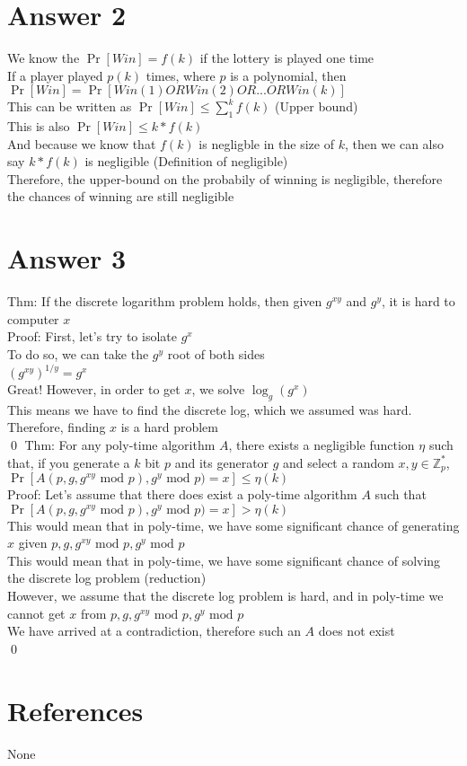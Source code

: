 \documentclass[11pt]{article}
\theoremstyle{definition}
\begin{document}
\section*{Answer 2}
We know the $\Pr[Win] = f(k)$ if the lottery is played one time\\
If a player played $p(k)$ times, where $p$ is a polynomial, then $\Pr[Win] = \Pr[Win(1) OR Win(2) OR ... OR Win(k)]$\\
This can be written as $\Pr[Win] \le \sum_{1}^{k}f(k)$ (Upper bound)\\
This is also $\Pr[Win] \le k*f(k)$\\
And because we know that $f(k)$ is negligble in the size of $k$, then we can also say $k*f(k)$ is negligible (Definition of negligible)\\
Therefore, the upper-bound on the probabily of winning is negligible, therefore the chances of winning are still negligible\\

\section*{Answer 3}
Thm: If the discrete logarithm problem holds, then given $g^{xy}$ and $g^{y}$, it is hard to computer $x$\\
\newline
Proof: First, let's try to isolate $g^x$\\
To do so, we can take the $g^y$ root of both sides\\
$(g^{xy})^{1/y} = g^x$\\
Great! However, in order to get $x$, we solve $\log_g(g^x)$\\
This means we have to find the discrete log, which we assumed was hard.  Therefore, finding $x$ is a hard problem\\
\qed
\newline
Thm: For any poly-time algorithm $A$, there exists a negligible function $\eta$ such that, if you generate a $k$ bit $p$ and its generator $g$ and select a random $x,y \in \mathbb{Z}_p^*$, $\Pr[A(p,g,g^{xy} \text { mod } p), g^y \text{ mod } p) = x] \le \eta(k)$\\
\newline
Proof: Let's assume that there does exist a poly-time algorithm $A$ such that $\Pr[A(p,g,g^{xy} \text { mod } p), g^y \text{ mod } p) = x] > \eta(k)$\\
This would mean that in poly-time, we have some significant chance of generating $x$ given $p, g, g^{xy} \text{ mod } p, g^y \text{ mod } p$\\
This would mean that in poly-time, we have some significant chance of solving the discrete log problem (reduction)\\
However, we assume that the discrete log problem is hard, and in poly-time we cannot get $x$ from $p, g, g^{xy} \text{ mod } p, g^y \text{ mod } p$\\
We have arrived at a contradiction, therefore such an $A$ does not exist\\
\qed


\noindent\hrulefill


\section*{References}

None
\end{document}
